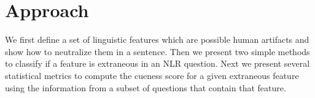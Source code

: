 \section{Approach}
\label{sec:approach}


We first define a set of linguistic features which are possible human artifacts and show 
how to neutralize them in a sentence. 
Then we present two simple methods to classify if a feature is extraneous in an NLR question.
Next we present several statistical metrics to compute the cueness score 
for a given extraneous feature using the information from a subset of questions that 
contain that feature.


